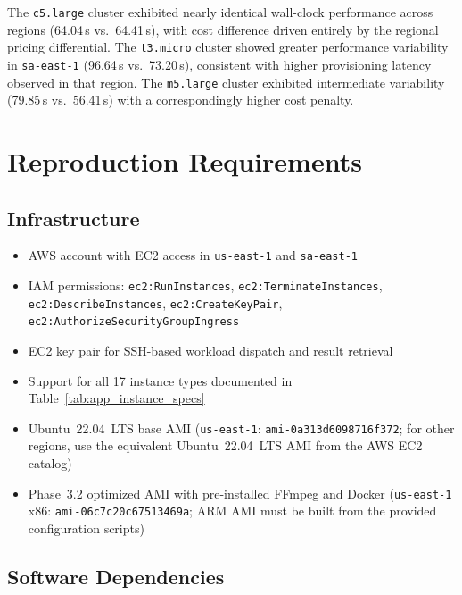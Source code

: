 \documentclass[conference]{IEEEtran}
\begin{document}
The \texttt{c5.large} cluster exhibited nearly identical wall-clock performance
across regions (64.04\,s vs.\ 64.41\,s), with cost difference driven entirely
by the regional pricing differential. The \texttt{t3.micro} cluster showed
greater performance variability in \texttt{sa-east-1} (96.64\,s vs.\ 73.20\,s),
consistent with higher provisioning latency observed in that region. The
\texttt{m5.large} cluster exhibited intermediate variability (79.85\,s vs.\
56.41\,s) with a correspondingly higher cost penalty.

\section{Reproduction Requirements}
\label{app:repro}

\subsection{Infrastructure}

\begin{itemize}
  \item AWS account with EC2 access in \texttt{us-east-1} and \texttt{sa-east-1}
  \item IAM permissions: \texttt{ec2:RunInstances}, \texttt{ec2:TerminateInstances},
        \texttt{ec2:DescribeInstances}, \texttt{ec2:CreateKeyPair},
        \texttt{ec2:AuthorizeSecurityGroupIngress}
  \item EC2 key pair for SSH-based workload dispatch and result retrieval
  \item Support for all 17 instance types documented in
        Table~\ref{tab:app_instance_specs}
  \item Ubuntu~22.04~LTS base AMI (\texttt{us-east-1}:
        \texttt{ami-0a313d6098716f372}; for other regions, use the equivalent
        Ubuntu~22.04~LTS AMI from the AWS EC2 catalog)
  \item Phase~3.2 optimized AMI with pre-installed FFmpeg and Docker
        (\texttt{us-east-1} x86: \texttt{ami-06c7c20c67513469a}; ARM AMI
        must be built from the provided configuration scripts)
\end{itemize}

\subsection{Software Dependencies}
\end{document}
